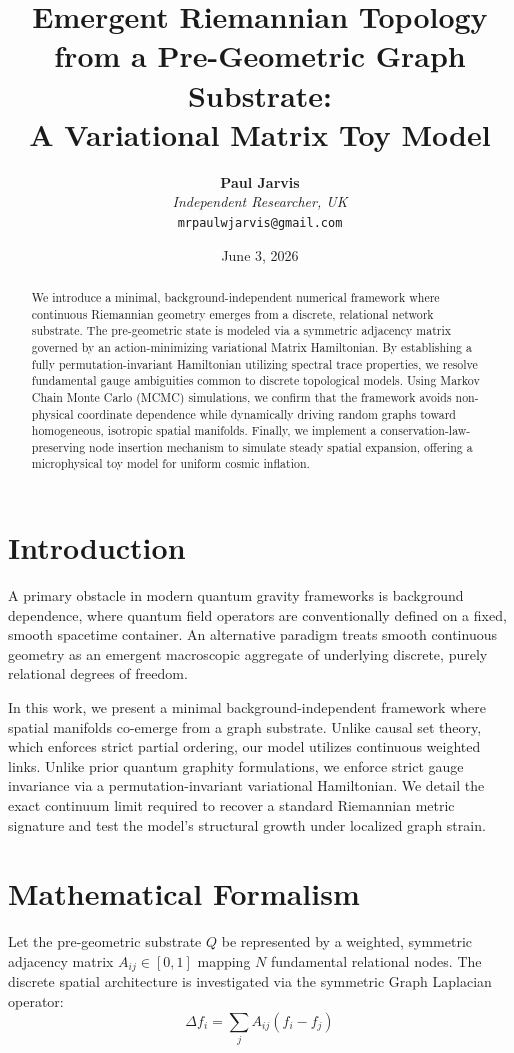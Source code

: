 \documentclass[11pt,twocolumn,a4paper]{article}
\title{\textbf{Emergent Riemannian Topology from a Pre-Geometric Graph Substrate:\\ A Variational Matrix Toy Model}}
\author{\textbf{Paul Jarvis} \\
\textit{Independent Researcher, UK} \\
\texttt{mrpaulwjarvis@gmail.com}}
\date{June 3, 2026}
\begin{document}
\maketitle

\begin{abstract}
We introduce a minimal, background-independent numerical framework where continuous Riemannian geometry emerges from a discrete, relational network substrate. The pre-geometric state is modeled via a symmetric adjacency matrix governed by an action-minimizing variational Matrix Hamiltonian. By establishing a fully permutation-invariant Hamiltonian utilizing spectral trace properties, we resolve fundamental gauge ambiguities common to discrete topological models. Using Markov Chain Monte Carlo (MCMC) simulations, we confirm that the framework avoids non-physical coordinate dependence while dynamically driving random graphs toward homogeneous, isotropic spatial manifolds. Finally, we implement a conservation-law-preserving node insertion mechanism to simulate steady spatial expansion, offering a microphysical toy model for uniform cosmic inflation.
\end{abstract}

\section{Introduction}
A primary obstacle in modern quantum gravity frameworks is background dependence, where quantum field operators are conventionally defined on a fixed, smooth spacetime container. An alternative paradigm treats smooth continuous geometry as an emergent macroscopic aggregate of underlying discrete, purely relational degrees of freedom.

In this work, we present a minimal background-independent framework where spatial manifolds co-emerge from a graph substrate. Unlike causal set theory, which enforces strict partial ordering, our model utilizes continuous weighted links. Unlike prior quantum graphity formulations, we enforce strict gauge invariance via a permutation-invariant variational Hamiltonian. We detail the exact continuum limit required to recover a standard Riemannian metric signature and test the model's structural growth under localized graph strain.

\section{Mathematical Formalism}
Let the pre-geometric substrate $Q$ be represented by a weighted, symmetric adjacency matrix $A_{ij} \in [0, 1]$ mapping $N$ fundamental relational nodes. The discrete spatial architecture is investigated via the symmetric Graph Laplacian operator:
\begin{equation}
\Delta f_i = \sum_{j} A_{ij} (f_i - f_j)
\end{equation}
\end{document}
